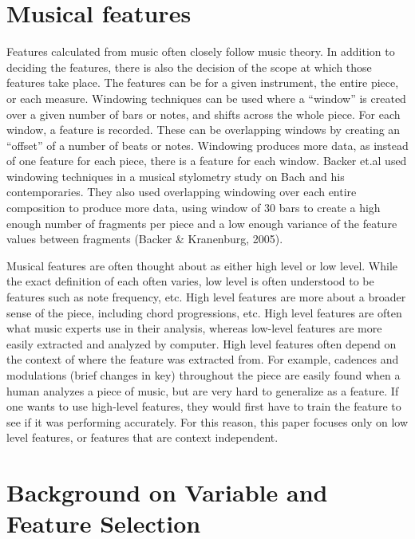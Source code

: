 \documentclass[12pt,twoside]{reedthesis}
\theoremstyle{definition}
\theoremstyle{definition}
\theoremstyle{definition}
\theoremstyle{remark}
\begin{document}
\section{Musical features}\label{musical-features}

Features calculated from music often closely follow music theory. In
addition to deciding the features, there is also the decision of the
scope at which those features take place. The features can be for a
given instrument, the entire piece, or each measure. Windowing
techniques can be used where a ``window'' is created over a given number
of bars or notes, and shifts across the whole piece. For each window, a
feature is recorded. These can be overlapping windows by creating an
``offset'' of a number of beats or notes. Windowing produces more data,
as instead of one feature for each piece, there is a feature for each
window. Backer et.al used windowing techniques in a musical stylometry
study on Bach and his contemporaries. They also used overlapping
windowing over each entire composition to produce more data, using
window of 30 bars to create a high enough number of fragments per piece
and a low enough variance of the feature values between fragments
(Backer \& Kranenburg, 2005).

Musical features are often thought about as either high level or low
level. While the exact definition of each often varies, low level is
often understood to be features such as note frequency, etc. High level
features are more about a broader sense of the piece, including chord
progressions, etc. High level features are often what music experts use
in their analysis, whereas low-level features are more easily extracted
and analyzed by computer. High level features often depend on the
context of where the feature was extracted from. For example, cadences
and modulations (brief changes in key) throughout the piece are easily
found when a human analyzes a piece of music, but are very hard to
generalize as a feature. If one wants to use high-level features, they
would first have to train the feature to see if it was performing
accurately. For this reason, this paper focuses only on low level
features, or features that are context independent.

\section{Background on Variable and Feature
Selection}\label{background-on-variable-and-feature-selection}
\end{document}
